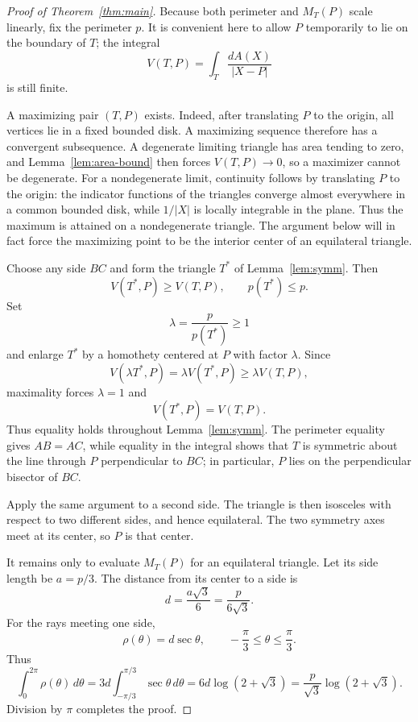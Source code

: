 \documentclass[11pt]{article}
\theoremstyle{remark}
\begin{document}
\begin{proof}[Proof of Theorem~\ref{thm:main}]
Because both perimeter and $M_T(P)$ scale linearly, fix the perimeter
$p$.  It is convenient here to allow $P$ temporarily to lie on the
boundary of $T$; the integral
\[
 V(T,P)=\int_T\frac{dA(X)}{|X-P|}
\]
is still finite.

A maximizing pair $(T,P)$ exists.  Indeed, after translating $P$ to
the origin, all vertices lie in a fixed bounded disk.  A maximizing
sequence therefore has a convergent subsequence.  A degenerate
limiting triangle has area tending to zero, and
Lemma~\ref{lem:area-bound} then forces $V(T,P)\to0$, so a maximizer
cannot be degenerate.  For a nondegenerate limit, continuity follows
by translating $P$ to the origin: the indicator functions of the
triangles converge almost everywhere in a common bounded disk, while
$1/|X|$ is locally integrable in the plane.  Thus the maximum is
attained on a nondegenerate triangle.  The argument below will in
fact force the maximizing point to be the interior center of an
equilateral triangle.

Choose any side $BC$ and form the triangle $T^*$ of
Lemma~\ref{lem:symm}.  Then
\[
 V(T^*,P)\ge V(T,P),
 \qquad
 p(T^*)\le p.
\]
Set
\[
 \lambda=\frac{p}{p(T^*)}\ge1
\]
and enlarge $T^*$ by a homothety centered at $P$ with factor
$\lambda$.  Since
\[
 V(\lambda T^*,P)=\lambda V(T^*,P)
 \ge \lambda V(T,P),
\]
maximality forces $\lambda=1$ and
\[
 V(T^*,P)=V(T,P).
\]
Thus equality holds throughout Lemma~\ref{lem:symm}.  The perimeter
equality gives $AB=AC$, while equality in the integral shows that
$T$ is symmetric about the line through $P$ perpendicular to $BC$;
in particular, $P$ lies on the perpendicular bisector of $BC$.

Apply the same argument to a second side.  The triangle is then
isosceles with respect to two different sides, and hence equilateral.
The two symmetry axes meet at its center, so $P$ is that center.

It remains only to evaluate $M_T(P)$ for an equilateral triangle.
Let its side length be $a=p/3$.  The distance from its center to a
side is
\[
 d=\frac{a\sqrt3}{6}=\frac{p}{6\sqrt3}.
\]
For the rays meeting one side,
\[
 \rho(\theta)=d\sec\theta,
 \qquad -\frac{\pi}{3}\le\theta\le\frac{\pi}{3}.
\]
Thus
\[
 \int_0^{2\pi}\rho(\theta)\,d\theta
 =
 3d\int_{-\pi/3}^{\pi/3}\sec\theta\,d\theta
 =
 6d\log(2+\sqrt3)
 =
 \frac{p}{\sqrt3}\log(2+\sqrt3).
\]
Division by $\pi$ completes the proof.
\end{proof}
\end{document}
